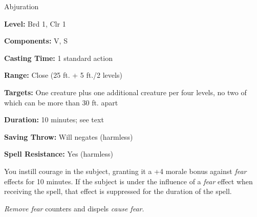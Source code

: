 
Abjuration

\textbf{Level:} Brd 1, Clr 1

\textbf{Components:} V, S

\textbf{Casting Time:} 1 standard action

\textbf{Range:} Close (25 ft. + 5 ft./2 levels)

\textbf{Targets:} One creature plus one additional creature per four levels, no 
two of which can be more than 30 ft. apart

\textbf{Duration:} 10 minutes; see text

\textbf{Saving Throw:} Will negates (harmless)

\textbf{Spell Resistance:} Yes (harmless)

You instill courage in the subject, granting it a +4 morale bonus against \textit{fear 
}effects for 10 minutes. If the subject is under the influence of a \textit{fear 
}effect when receiving the spell, that effect is suppressed for the duration of 
the spell.

\textit{Remove fear} counters and dispels \textit{cause fear}.

